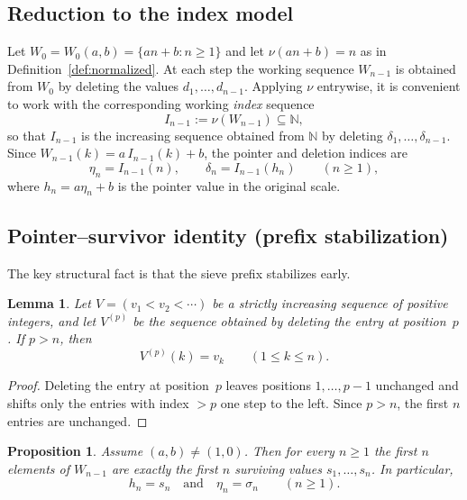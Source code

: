\documentclass[11pt]{article}
\numberwithin{equation}{section}
\theoremstyle{plain}
\newtheorem{lemma}[theorem]{Lemma}
\newtheorem{proposition}[theorem]{Proposition}
\theoremstyle{definition}
\theoremstyle{remark}
\newcommand{\N}{\mathbb{N}}
\begin{document}
\subsection{Reduction to the index model}\label{sec:twogap}
Let $W_0=W_0(a,b)=\{an+b:n\ge1\}$ and let $\nu(an+b)=n$ as in
Definition~\ref{def:normalized}.  At each step the working sequence
$W_{n-1}$ is obtained from $W_0$ by deleting the values
$d_1,\ldots,d_{n-1}$.  Applying $\nu$ entrywise, it is convenient to
work with the corresponding working \emph{index} sequence
\[
  I_{n-1}:=\nu(W_{n-1})\subseteq\N,
\]
so that $I_{n-1}$ is the increasing sequence obtained from $\N$ by
deleting $\delta_1,\ldots,\delta_{n-1}$.
Since $W_{n-1}(k)=a\,I_{n-1}(k)+b$, the pointer and deletion indices are
\begin{equation}\label{eq:index-model}
  \eta_n = I_{n-1}(n),\qquad
  \delta_n = I_{n-1}(h_n)\qquad (n\ge1),
\end{equation}
where $h_n=a\eta_n+b$ is the pointer value in the original scale.

\subsection{Pointer--survivor identity (prefix stabilization)}

The key structural fact is that the sieve prefix stabilizes early.

\begin{lemma}\label{lem:prefix-stability}
Let $V=(v_1<v_2<\cdots)$ be a strictly increasing sequence of positive
integers, and let $V^{(p)}$ be the sequence obtained by deleting the
entry at position~$p$.  If $p>n$, then
\[
  V^{(p)}(k)=v_k \qquad (1\le k\le n).
\]
\end{lemma}

\begin{proof}
Deleting the entry at position~$p$ leaves positions $1,\dots,p-1$
unchanged and shifts only the entries with index $>p$ one step to the
left.  Since $p>n$, the first $n$ entries are unchanged.
\end{proof}

\begin{proposition}\label{thm:pointer-survivor}
Assume $(a,b)\neq(1,0)$.
Then for every $n\ge1$ the first $n$ elements of $W_{n-1}$ are exactly
the first $n$ surviving values $s_1,\ldots,s_n$.  In particular,
\[
  h_n=s_n \quad\text{and}\quad \eta_n=\sigma_n \qquad (n\ge1).
\]
\end{proposition}
\end{document}
